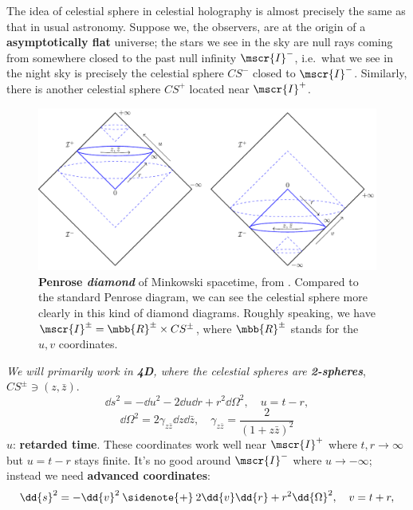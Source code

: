 \documentclass[a4paper
	,10pt
]{article}
\begin{document}
	The idea of celestial sphere in celestial holography is almost precisely the same as that in usual astronomy. Suppose we, the observers, are at the origin of a \textbf{asymptotically flat} universe; the stars we see in the sky are null rays coming from somewhere closed to the past null infinity $\mscr{I}^-$, i.e.~what we see in the night sky is precisely the celestial sphere $CS^-$ closed to $\mscr{I}^-$. Similarly, there is another celestial sphere $CS^+$ located near $\mscr{I}^+$. 
	
	\begin{figure}[!h]
	\centering
	\includegraphics[width=.85\linewidth]{img/bond.pdf}
	\caption[Penrose diamond of Minkowski spacetime]{
		\textbf{Penrose \textsl{diamond}} of Minkowski spacetime, from \cite{Strominger:2017zoo}. Compared to the standard Penrose diagram, we can see the celestial sphere more clearly in this kind of diamond diagrams. Roughly speaking, we have $\mscr{I}^\pm = \mbb{R}^\pm \times CS^\pm$, where $\mbb{R}^\pm$ stands for the $u,v$ coordinates.
	}
	\end{figure}
	
	\textsl{We will primarily work in \textbf{4D}, where the celestial spheres are \textbf{2-spheres}}, $CS^\pm \ni (z,\bar{z})$. 
	\begin{equation}
		\dd{s}^2
		= - \dd{u}^2 - 2\dd{u} \dd{r}
			+ r^2 \dd{\Omega}^2,
	\quad
		u = t - r,
	\end{equation}
	\vspace{-.8\baselineskip}
	\begin{equation}
		\dd{\Omega}^2
		= 2\gamma_{z\bar{z}} \dd{z} \dd{\bar{z}},
	\quad
		\gamma_{z\bar{z}}
		= \frac{2}{(1 + z\bar{z})^2}
	\label{eq:metric_null_plus}
	\end{equation}
	$u$: \textbf{retarded time}. 
	These coordinates work well near $\mscr{I}^+$ where $t,r\to\infty$ but $u = t - r$ stays finite. It's no good around $\mscr{I}^-$ where $u\to -\infty$; instead we need \textbf{advanced coordinates}:
	\begin{equation}
		\dd{s}^2
		= - \dd{v}^2
			\mathbin{\sidenote{+}} 2\dd{v} \dd{r}
			+ r^2 \dd{\Omega}^2,
	\quad
		v = t + r,
	\end{equation}
	
\end{document}
